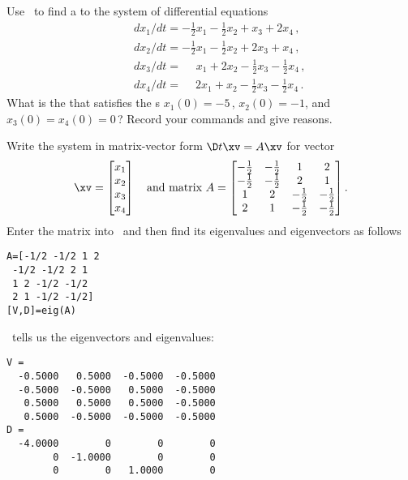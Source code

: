 \begin{example} 
Use \script\ to find a  to the system of differential equations
\begin{eqnarray*}
&&dx_1/dt=-\tfrac12x_1-\tfrac12x_2+x_3+2x_4\,, 
\\&&dx_2/dt=-\tfrac12x_1-\tfrac12x_2+2x_3+x_4\,, 
\\&&dx_3/dt=\phantom{+2} x_1+2x_2-\tfrac12x_3-\tfrac12x_4\,,  
\\&&dx_4/dt=\phantom{+}2x_1+x_2-\tfrac12x_3-\tfrac12x_4\,.
\end{eqnarray*}
What is the  that satisfies the s \(x_1(0)=-5\)\,, \(x_2(0)=-1\), and \(x_3(0)=x_4(0)=0\)\,?
Record your commands and give reasons.
\begin{solution} 
Write the system in matrix-vector form \(\D t\xv=A\xv\) for vector 
\begin{equation*}
\xv=\begin{bmatrix} x_1\\x_2\\x_3\\x_4 \end{bmatrix}
\quad\text{and matrix }
A=\begin{bmatrix} -\tfrac12 & -\tfrac12 & 1 & 2
\\-\tfrac12 & -\tfrac12 & 2 & 1
\\1 & 2 & -\tfrac12 & -\tfrac12
\\2 & 1 & -\tfrac12 & -\tfrac12 \end{bmatrix}.
\end{equation*}
Enter the matrix into \script\ and then find its eigenvalues and eigenvectors as follows
\begin{verbatim}
A=[-1/2 -1/2 1 2
 -1/2 -1/2 2 1
 1 2 -1/2 -1/2
 2 1 -1/2 -1/2]
[V,D]=eig(A)
\end{verbatim}
\setbox\ajrqrbox\hbox{}\marginajrbox%
\script\ tells us the eigenvectors and eigenvalues:
\begin{verbatim}
V =
  -0.5000   0.5000  -0.5000  -0.5000
  -0.5000  -0.5000   0.5000  -0.5000
   0.5000   0.5000   0.5000  -0.5000
   0.5000  -0.5000  -0.5000  -0.5000
D =
  -4.0000        0        0        0
        0  -1.0000        0        0
        0        0   1.0000        0

\end{verbatim}
\end{solution}
\end{example}
